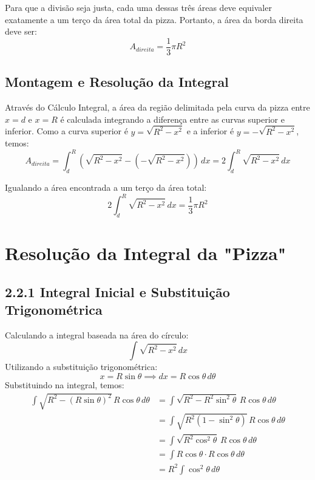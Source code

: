 \documentclass[12pt,a4paper]{article}
\begin{document}
Para que a divis\~ao seja justa, cada uma dessas tr\^es \'areas deve equivaler exatamente a um ter\c{c}o da \'area total da pizza. Portanto, a \'area da borda direita deve ser:
\begin{equation}
A_{direita} = \frac{1}{3} \pi R^2
\end{equation}

\subsection{Montagem e Resolu\c{c}\~ao da Integral}
Atrav\'es do C\'alculo Integral, a \'area da regi\~ao delimitada pela curva da pizza entre $x = d$ e $x = R$ \'e calculada integrando a diferen\c{c}a entre as curvas superior e inferior. Como a curva superior \'e $y = \sqrt{R^2 - x^2}$ e a inferior \'e $y = -\sqrt{R^2 - x^2}$, temos:
\begin{equation}
A_{direita} = \int_{d}^{R} \left( \sqrt{R^2 - x^2} - \left( -\sqrt{R^2 - x^2} \right) \right) \, dx = 2 \int_{d}^{R} \sqrt{R^2 - x^2} \, dx
\end{equation}

Igualando a \'area encontrada a um ter\c{c}o da \'area total:
\begin{equation}
2 \int_{d}^{R} \sqrt{R^2 - x^2} \, dx = \frac{1}{3} \pi R^2
\end{equation}

\section*{Resolução da Integral da "Pizza"}

\subsection*{2.2.1 Integral Inicial e Substituição Trigonométrica}
Calculando a integral baseada na área do círculo:
\[ \int \sqrt{R^2 - x^2} \, dx \]
Utilizando a substituição trigonométrica:
\[ x = R \sin \theta \implies dx = R \cos \theta \, d\theta \]
Substituindo na integral, temos:
\begin{align*}
\int \sqrt{R^2 - (R \sin \theta)^2} \, R \cos \theta \, d\theta &= \int \sqrt{R^2 - R^2 \sin^2 \theta} \, R \cos \theta \, d\theta \\
&= \int \sqrt{R^2(1 - \sin^2 \theta)} \, R \cos \theta \, d\theta \\
&= \int \sqrt{R^2 \cos^2 \theta} \, R \cos \theta \, d\theta \\
&= \int R \cos \theta \cdot R \cos \theta \, d\theta \\
&= R^2 \int \cos^2 \theta \, d\theta
\end{align*}
\end{document}
